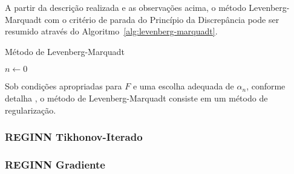 A partir da descrição realizada e as observações acima, o método Levenberg-Marquadt com o critério de parada do Princípio da Discrepância pode ser resumido através do Algoritmo~\ref{alg:levenberg-marquadt}.

\begin{algorithm}[H] \label{alg:levenberg-marquadt}
    \LinesNumbered
    \caption{Método de Levenberg-Marquadt}
    $n \gets 0$ \\
\end{algorithm}


Sob condições apropriadas para $F$ e uma escolha adequada de $\alpha_n$, conforme detalha , o método de Levenberg-Marquadt consiste em um método de regularização.

\subsubsection{REGINN Tikhonov-Iterado}

\subsubsection{REGINN Gradiente}